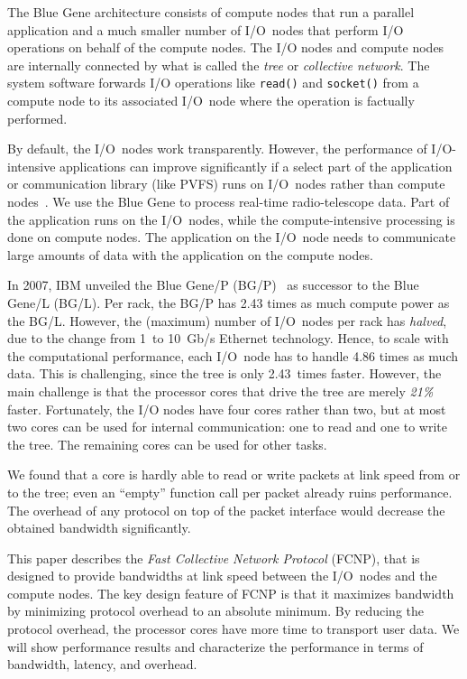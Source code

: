 \documentclass[journal]{IEEEtran}
\begin{document}
The Blue Gene architecture consists of compute nodes that run a parallel
application and a much smaller number of I/O~nodes that perform
I/O operations on behalf of the compute nodes.
The I/O nodes and compute nodes are internally connected by what is called the
\emph{tree\/} or \emph{collective network}.
The system software forwards I/O operations like \texttt{read()} and
\texttt{socket()} from a compute node to its associated I/O~node where the
operation is factually performed.

By default, the I/O~nodes work transparently.
However, the performance of I/O-intensive applications can improve
significantly if a select part of the application or communication library
(like PVFS) runs on I/O~nodes rather than compute nodes~\cite{Iskra:08}.
We use the Blue Gene to process real-time radio-telescope data.
Part of the application runs on the I/O~nodes, while the compute-intensive
processing is done on compute nodes.
The application on the I/O~node needs to communicate large amounts of data
with the application on the compute nodes.

In 2007, IBM unveiled the Blue Gene/P (BG/P)~\cite{IBM:08} as successor to
the Blue Gene/L (BG/L).
Per rack, the BG/P has 2.43 times as much compute power as the BG/L.
However, the (maximum) number of I/O~nodes per rack has \emph{halved}, due to
the change from 1~to 10~Gb/s Ethernet technology.
Hence, to scale with the computational performance, each I/O~node has to
handle 4.86 times as much data.
This is challenging, since the tree is only 2.43~times faster.
However, the main challenge is that the processor cores that drive the tree
are merely \emph{21\%\/} faster.
Fortunately, the I/O nodes have four cores rather than two, but at most two
cores can be used for internal communication: one to read and one to write the
tree.
The remaining cores can be used for other tasks.

We found that a core is hardly able to read or write packets at
link speed from or to the tree; even an ``empty'' function call per packet
already ruins performance.
The overhead of any protocol on top of the packet interface would decrease
the obtained bandwidth significantly.


This paper describes the \emph{Fast Collective Network Protocol\/} (FCNP),
that is designed to provide bandwidths at link speed between the I/O~nodes
and the compute nodes.
The key design feature of FCNP is that it maximizes bandwidth by minimizing
protocol overhead to an absolute minimum.
By reducing the protocol overhead, the processor cores have more time to
transport user data.
We will show performance results and characterize the performance in terms
of bandwidth, latency, and overhead.
\end{document}
